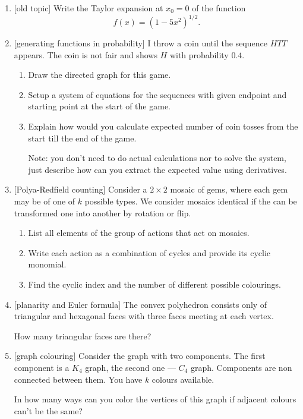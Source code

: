 \documentclass[12pt]{article}
\begin{document}
\begin{enumerate}
    \item {[old topic]} Write the Taylor expansion at $x_0 = 0$ of the function 
    \[
    f(x) = (1 - 5x^2)^{1/2}.
    \]
    \item {[generating functions in probability]} 
    I throw a coin until the sequence $HTT$ appears. The coin is not fair and shows $H$ with probability $0.4$.
\begin{enumerate}[label=\alph*)]
    \item Draw the directed graph for this game.
    \item Setup a system of equations for the sequences with given endpoint and starting point at the start of the game. 
    \item Explain how would you calculate expected number of coin tosses from the start till the end of the game.
    
    Note: you don't need to do actual calculations nor to solve the system, just describe how can you extract the expected value using derivatives. 
\end{enumerate}

    \item {[Polya-Redfield counting]} Consider a $2\times 2$ mosaic of gems, where each gem may be of one of $k$ possible types.
    We consider mosaics identical if the can be transformed one into another by rotation or flip. 
\begin{enumerate}[label=\alph*)]
    \item List all elements of the group of actions that act on mosaics.
    \item Write each action as a combination of cycles and provide its cyclic monomial. 
    \item Find the cyclic index and the number of different possible colourings.
\end{enumerate}
    \item {[planarity and Euler formula]} The convex polyhedron consists only of  triangular and  hexagonal faces  with  three faces meeting at each vertex.
    
    How many triangular faces are there?

    \item {[graph colouring]} Consider the graph with two components. The first component is a $K_4$ graph, the second one — $C_4$ graph. 
    Components are non connected between them. You have $k$ colours available.

    In how many ways can you color the vertices of this graph if adjacent colours can't be the same?
    

\end{enumerate}
\end{document}
